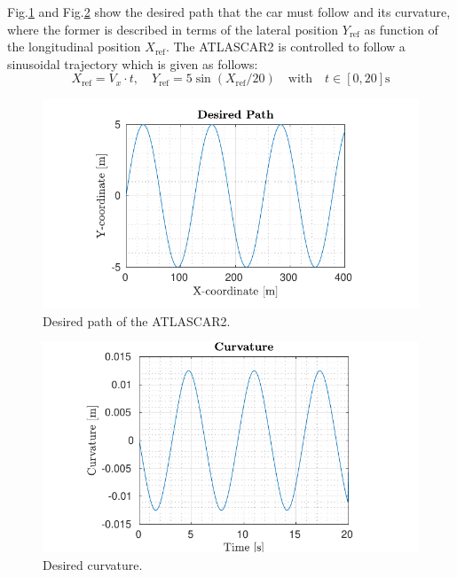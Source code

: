 \documentclass[conference, 11pt]{IEEEtran}
\begin{document}
Fig.\ref{fig:reference_laneFollowing} and Fig.\ref{fig:curvature_laneFollowing} show the desired path that the car must follow and its curvature, where the former is described in terms of the lateral position $Y_{\text{ref}}$ as function of the longitudinal position $X_{\text{ref}}$.  The ATLASCAR2 is controlled to
follow a sinusoidal trajectory which is given as follows:
\begin{equation*}
	X_\text{ref}=V_x\cdot t, \quad Y_\text{ref}=5\sin(X_\text{ref}/20)\quad \text{with}\quad t\in[0,20]\text{s}
\end{equation*}
\begin{figure}[!h]
	\centering
	\includegraphics[width=1\columnwidth]{../../MATLAB/lane_following/figure/Reference.pdf}
	\caption{Desired path of the ATLASCAR2.}
	\label{fig:reference_laneFollowing}
\end{figure}
\begin{figure}[!h]
	\centering
	\includegraphics[width=1\columnwidth]{../../MATLAB/lane_following/figure/Curvature.pdf}
	\caption{Desired curvature.}
	\label{fig:curvature_laneFollowing}
\end{figure}
\end{document}

